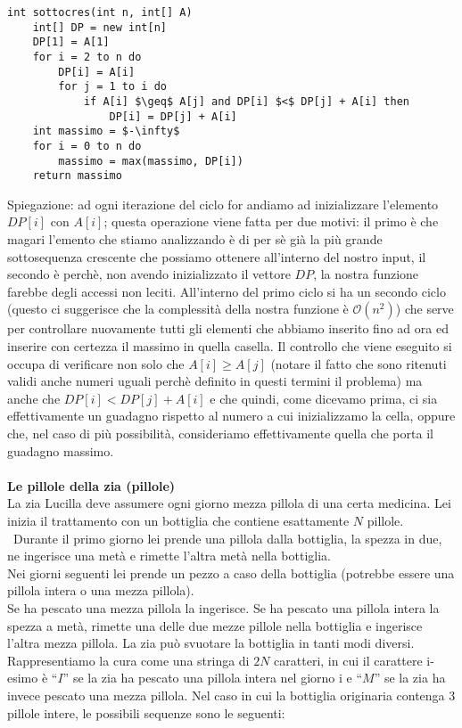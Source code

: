 \documentclass[../cheatSheetAlgoritmi.tex]{subfiles}
\begin{document}
\begin{lstlisting}[caption=Sottoinsieme Crescente di Somma Massima]
int sottocres(int n, int[] A)
	int[] DP = new int[n]
	DP[1] = A[1]
	for i = 2 to n do
		DP[i] = A[i]
		for j = 1 to i do
			if A[i] $\geq$ A[j] and DP[i] $<$ DP[j] + A[i] then
				DP[i] = DP[j] + A[i]
	int massimo = $-\infty$
	for i = 0 to n do
		massimo = max(massimo, DP[i])
	return massimo
\end{lstlisting} 
Spiegazione: ad ogni iterazione del ciclo for andiamo ad inizializzare l'elemento $DP[i]$ con $A[i]$; questa operazione viene fatta per due motivi: il primo è che magari l'emento che stiamo analizzando è di per sè già la più grande sottosequenza crescente che possiamo ottenere all'interno del nostro input, il secondo è perchè, non avendo inizializzato il vettore $DP$, la nostra funzione farebbe degli accessi non leciti. All'interno del primo ciclo si ha un secondo ciclo (questo ci suggerisce che la complessità della nostra funzione è $\mathcal{O}(n^{2})$) che serve per controllare nuovamente tutti gli elementi che abbiamo inserito fino ad ora ed inserire con certezza il massimo in quella casella. Il controllo che viene eseguito si occupa di verificare non solo che $A[i] \geq A[j]$ (notare il fatto che sono ritenuti validi anche numeri uguali perchè definito in questi termini il problema) ma anche che $DP[i] < DP[j] + A[i]$ e che quindi, come dicevamo prima, ci sia effettivamente un guadagno rispetto al numero a cui inizializzamo la cella, oppure che, nel caso di più possibilità, consideriamo effettivamente quella che porta il guadagno massimo.\\\\
\textbf{Le pillole della zia (pillole)}\\
La zia Lucilla deve assumere ogni giorno mezza pillola di una certa medicina. Lei inizia il trattamento con un bottiglia che contiene esattamente $N$ pillole.\\\
Durante il primo giorno lei prende una pillola dalla bottiglia, la spezza in due, ne ingerisce una metà e rimette l'altra metà nella bottiglia.\\
Nei giorni seguenti lei prende un pezzo a caso della bottiglia (potrebbe essere una pillola intera o una mezza pillola).\\
Se ha pescato una mezza pillola la ingerisce. Se ha pescato una pillola intera la spezza a metà, rimette una delle due mezze pillole nella bottiglia e ingerisce l’altra mezza pillola.
La zia può svuotare la bottiglia in tanti modi diversi. Rappresentiamo la cura come una stringa di $2N$ caratteri, in cui il carattere i-esimo è “$I$” se la zia ha pescato una pillola intera nel giorno i e “$M$” se la zia ha invece pescato una mezza pillola. Nel caso in cui la bottiglia originaria contenga 3 pillole intere, le possibili sequenze sono le seguenti:\\
\end{document}
